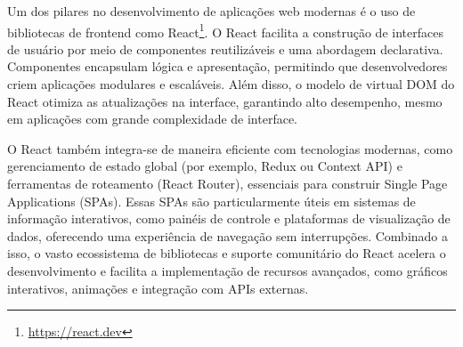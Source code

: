 Um dos pilares no desenvolvimento de aplicações web modernas é o uso de bibliotecas de frontend como React\footnote{\url{https://react.dev}}. O React facilita a construção de interfaces de usuário por meio de componentes reutilizáveis e uma abordagem declarativa. Componentes encapsulam lógica e apresentação, permitindo que desenvolvedores criem aplicações modulares e escaláveis. Além disso, o modelo de virtual DOM do React otimiza as atualizações na interface, garantindo alto desempenho, mesmo em aplicações com grande complexidade de interface.

O React também integra-se de maneira eficiente com tecnologias modernas, como gerenciamento de estado global (por exemplo, Redux ou Context API) e ferramentas de roteamento (React Router), essenciais para construir Single Page Applications (SPAs). Essas SPAs são particularmente úteis em sistemas de informação interativos, como painéis de controle e plataformas de visualização de dados, oferecendo uma experiência de navegação sem interrupções. Combinado a isso, o vasto ecossistema de bibliotecas e suporte comunitário do React acelera o desenvolvimento e facilita a implementação de recursos avançados, como gráficos interativos, animações e integração com APIs externas.


